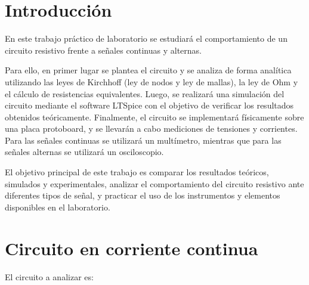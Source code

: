 \documentclass[]{informeutn}
\begin{document}
\maketitle

\tableofcontents
\setcounter{page}{1}
\thispagestyle{plain}

\chapter{Introducción}

En este trabajo práctico de laboratorio se estudiará el comportamiento de un circuito resistivo frente a señales continuas y alternas.

Para ello, en primer lugar se plantea el circuito y se analiza de forma analítica utilizando las leyes de Kirchhoff (ley de nodos y
ley de mallas), la ley de Ohm y el cálculo de resistencias equivalentes. Luego, se realizará una simulación del circuito mediante el
software LTSpice con el objetivo de verificar los resultados obtenidos teóricamente. Finalmente, el circuito se implementará
físicamente sobre una placa protoboard, y se llevarán a cabo mediciones de tensiones y corrientes. Para las señales continuas se
utilizará un multímetro, mientras que para las señales alternas se utilizará un osciloscopio.

El objetivo principal de este trabajo es comparar los resultados teóricos, simulados y experimentales, analizar el comportamiento 
del circuito resistivo ante diferentes tipos de señal, y practicar el uso de los instrumentos y elementos disponibles en el laboratorio.

\chapter{Circuito en corriente continua}

El circuito a analizar es:
\newcommand{\VS}{10\V}
\newcommand{\Ra}{10\kohm}
\newcommand{\Rb}{4.7\kohm}
\newcommand{\Rc}{3.3\kohm}
\end{document}

